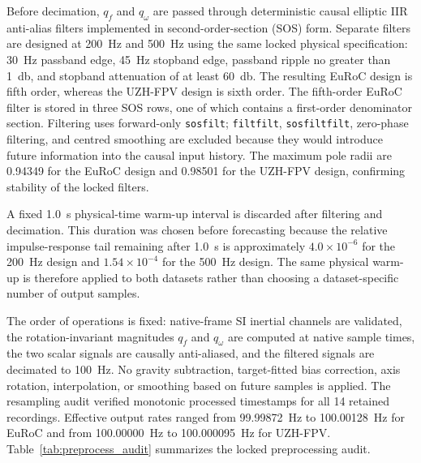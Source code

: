\documentclass[preprint,12pt]{elsarticle}
\newcommand{\qf}{q_f}
\newcommand{\qw}{q_\omega}
\begin{document}
Before decimation, $\qf$ and $\qw$ are passed through deterministic causal elliptic IIR anti-alias filters implemented in second-order-section (SOS) form. Separate filters are designed at \SI{200}{\hertz} and \SI{500}{\hertz} using the same locked physical specification: \SI{30}{\hertz} passband edge, \SI{45}{\hertz} stopband edge, passband ripple no greater than \SI{1}{\decibel}, and stopband attenuation of at least \SI{60}{\decibel}. The resulting EuRoC design is fifth order, whereas the UZH-FPV design is sixth order. The fifth-order EuRoC filter is stored in three SOS rows, one of which contains a first-order denominator section. Filtering uses forward-only \texttt{sosfilt}; \texttt{filtfilt}, \texttt{sosfiltfilt}, zero-phase filtering, and centred smoothing are excluded because they would introduce future information into the causal input history. The maximum pole radii are 0.94349 for the EuRoC design and 0.98501 for the UZH-FPV design, confirming stability of the locked filters.

A fixed \SI{1.0}{\second} physical-time warm-up interval is discarded after filtering and decimation. This duration was chosen before forecasting because the relative impulse-response tail remaining after \SI{1.0}{\second} is approximately $4.0\times10^{-6}$ for the \SI{200}{\hertz} design and $1.54\times10^{-4}$ for the \SI{500}{\hertz} design. The same physical warm-up is therefore applied to both datasets rather than choosing a dataset-specific number of output samples.

The order of operations is fixed: native-frame SI inertial channels are validated, the rotation-invariant magnitudes $\qf$ and $\qw$ are computed at native sample times, the two scalar signals are causally anti-aliased, and the filtered signals are decimated to \SI{100}{\hertz}. No gravity subtraction, target-fitted bias correction, axis rotation, interpolation, or smoothing based on future samples is applied. The resampling audit verified monotonic processed timestamps for all 14 retained recordings. Effective output rates ranged from \SI{99.99872}{\hertz} to \SI{100.00128}{\hertz} for EuRoC and from \SI{100.00000}{\hertz} to \SI{100.000095}{\hertz} for UZH-FPV. Table~\ref{tab:preprocess_audit} summarizes the locked preprocessing audit.
\end{document}
